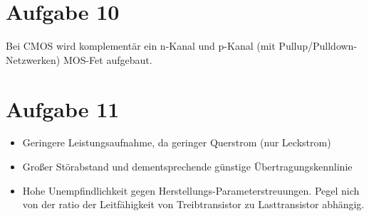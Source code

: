 \documentclass[a4paper]{scrartcl}
\begin{document}
\section*{Aufgabe 10}
Bei CMOS wird komplementär ein n-Kanal und p-Kanal (mit Pullup/Pulldown-Netzwerken) MOS-Fet aufgebaut.


\section*{Aufgabe 11}
\begin{itemize}
	\item Geringere Leistungsaufnahme, da geringer Querstrom (nur Leckstrom)
	\item Großer Störabstand und dementsprechende günstige Übertragungskennlinie
	\item Hohe Unempfindlichkeit gegen Herstellungs-Parameterstreuungen. Pegel nich von der ratio der Leitfähigkeit von Treibtransistor zu Lasttransistor abhängig.
\end{itemize}
\end{document}
